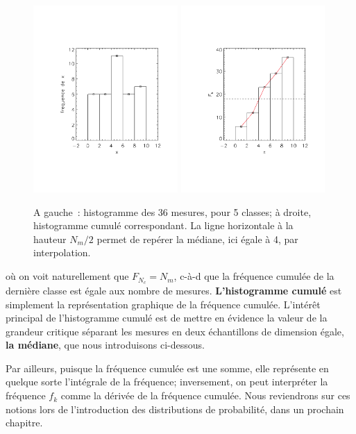 \begin{figure}[h]
   \centering
   \includegraphics[width=5.5cm]{assets/figures/hist5classes.pdf}\hspace{5mm}
   \includegraphics[width=5.5cm]{assets/figures/histCumul5classes.pdf}
   \caption{A gauche~: histogramme des 36 mesures, pour 5 classes; à droite, histogramme cumulé correspondant. La ligne horizontale à la hauteur $N_m/2$ permet de repérer la médiane, ici égale à 4, par interpolation.}
   \label{fig:hcapoabdc}
\end{figure}
où on voit naturellement que $F_{N_c}=N_m$, c-à-d que la fréquence cumulée de la dernière classe est égale aux nombre de mesures. \textbf{L'histogramme cumulé} est simplement la représentation graphique de la fréquence cumulée. L'intérêt principal de l'histogramme cumulé est de mettre en évidence la valeur de la grandeur critique séparant les mesures en deux échantillons de dimension égale, \textbf{la médiane}, que nous introduisons ci-dessous.

Par ailleurs, puisque la fréquence cumulée est une somme, elle représente en quelque sorte l'intégrale de la fréquence; inversement, on peut interpréter la fréquence $f_k$ comme la dérivée de la fréquence cumulée. Nous reviendrons sur ces notions lors de l'introduction des distributions de probabilité, dans un prochain chapitre.

